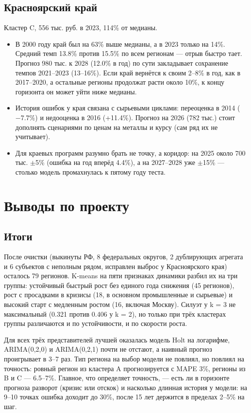 \documentclass[12pt,a4paper]{report}
\begin{document}
\section{Красноярский край}

Кластер C, 556 тыс. руб. в 2023, 114\% от медианы.

\begin{itemize}
    \item В 2000 году край был на 63\% выше медианы, а в 2023 только на 14\%. Средний темп 13.8\% против 15.5\% по всем регионам --- отрыв быстро тает. Прогноз 980 тыс. к 2028 (12.0\% в год) по сути закладывает сохранение темпов 2021--2023 (13--16\%). Если край вернётся к своим 2--8\% в год, как в 2017--2020, а остальные регионы продолжат расти около 10\%, к концу горизонта он может уйти ниже медианы.
    \item История ошибок у края связана с сырьевыми циклами: переоценка в 2014 ($-7.7\%$) и недооценка в 2016 (+11.4\%). Прогноз на 2026 (782 тыс.) стоит дополнять сценариями по ценам на металлы и курсу (сам ряд их не учитывает).
    \item Для краевых программ разумно брать не точку, а коридор: на 2025 около 700 тыс. $\pm$5\% (ошибка на год вперёд 4.4\%), а на 2027--2028 уже $\pm$15\% --- столько модель промахнулась к пятому году теста.
\end{itemize}

\chapter{Выводы по проекту}

\section{Итоги}

После очистки (выкинуты РФ, 8 федеральных округов, 2 дублирующих агрегата и 6 субъектов с неполным рядом, исправлен выброс у Красноярского края) осталось 79 регионов. K-means на пяти признаках динамики разбил их на три группы: устойчивый быстрый рост без единого года снижения (45 регионов), рост с просадками в кризисы (18, в основном промышленные и сырьевые) и высокий старт с медленным ростом (16, включая Москву). Силуэт у k = 3 не максимальный (0.321 против 0.406 у k = 2), но только при трёх кластерах группы различаются и по устойчивости, и по скорости роста.

Для всех трёх представителей лучшей оказалась модель Holt на логарифме, ARIMA(0,2,0) и ARIMA(0,2,1) почти не отстают, а наивный прогноз проигрывает в 3--7 раз. Тип региона на выбор модели не повлиял, но повлиял на точность: ровный регион из кластера A прогнозируется с MAPE 3\%, регионы из B и C --- 6.5--7\%. Главное, что определяет точность, --- есть ли в горизонте прогноза разворот (кризис или отскок) и насколько длинная история у модели: на 9--10 точках ошибка доходит до 30\%, после 15 лет держится в пределах 2--5\% на шаг.
\end{document}
